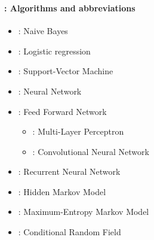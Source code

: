 \documentclass[xcolor=table]{beamer}
\subtitle[02- ML for NLP]{Chapter 02\\Machine learning for NLP}
\begin{document}
	
	
\begin{frame}
	\frametitle{\inserttitle}
	\framesubtitle{\insertshortsubtitle: Algorithms and abbreviations}
	
	\begin{itemize}
		\item {}: Naive Bayes
		\item {}: Logistic regression
		\item {}: Support-Vector Machine
		\item {}: Neural Network
		\item {}: Feed Forward Network
		\begin{itemize}
			\item {}: Multi-Layer Perceptron
			\item {}: Convolutional Neural Network
		\end{itemize}
		\item {}: Recurrent Neural Network
		\item {}: Hidden Markov Model
		\item {}: Maximum-Entropy Markov Model
		\item {}: Conditional Random Field
	\end{itemize}
	
\end{frame}
\end{document}
